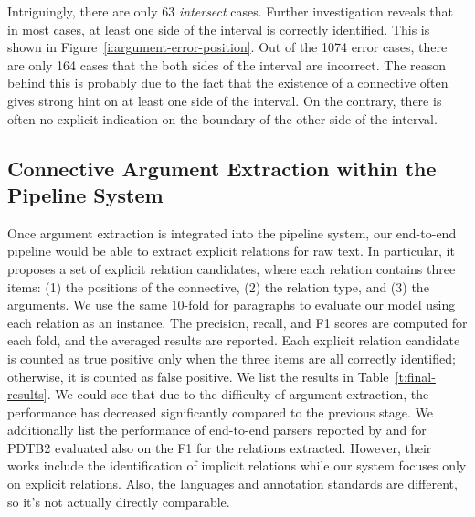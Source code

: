

Intriguingly, there are only 63 \textit{intersect} cases. Further investigation
reveals that in most cases, at least one side of the interval is correctly
identified. This is shown in Figure~\ref{i:argument-error-position}. Out of
the 1074 error cases, there are only 164 cases that the both sides of the
interval are incorrect. The reason behind this is probably due to the fact that
the existence of a connective often gives strong hint on at least one side of
the interval. On the contrary, there is often no explicit indication on the boundary
of the other side of the interval.



\subsection{Connective Argument Extraction within the Pipeline System}

Once argument extraction is integrated into the pipeline system, our end-to-end
pipeline would be able to extract explicit relations for raw text. In particular,
it proposes a set of explicit relation candidates, where each relation contains
three items: (1) the positions of the connective, (2) the relation type, and
(3) the arguments. We use the same 10-fold for paragraphs to evaluate our model
using each relation
as an instance. The precision, recall, and F1 scores are computed for each fold,
and the averaged results are reported. Each explicit relation candidate is
counted as true positive only when the three items are all correctly
identified; otherwise, it is counted as false positive. We list the results
in Table~\ref{t:final-results}. We could see that due to the difficulty
of argument extraction, the performance has decreased significantly compared
to the previous stage. We additionally list the performance of end-to-end
parsers reported by \cite{lin2014pdtb} and \cite{kong2014a} for PDTB2 evaluated
also on the F1 for the relations extracted. However, their works include the
identification of implicit relations while our system focuses only on explicit relations.
Also, the languages and annotation standards are different, so it's not actually
directly comparable.


